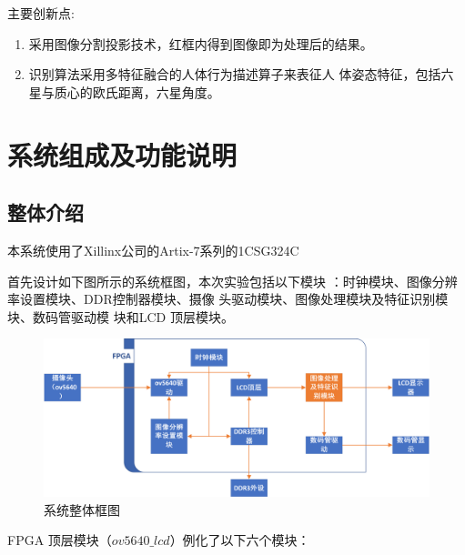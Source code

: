 \documentclass[UTF-8, a4paper, 12pt]{ctexart}
\begin{document}
主要创新点:
\begin{enumerate}
    \item 采用图像分割投影技术，红框内得到图像即为处理后的结果。
    \item 识别算法采用多特征融合的人体行为描述算子来表征人
    体姿态特征，包括六星与质心的欧氏距离，六星角度。
\end{enumerate}

\section{系统组成及功能说明}

\subsection{整体介绍}

本系统使用了Xillinx公司的Artix-7系列的1CSG324C

首先设计如下图所示的系统框图，本次实验包括以下模块
：时钟模块、图像分辨率设置模块、DDR控制器模块、摄像
头驱动模块、图像处理模块及特征识别模块、数码管驱动模
块和LCD 顶层模块。

\begin{figure}[htbp]
    \centering
    \includegraphics[width=15cm]{figs/f1.png}
    \caption{系统整体框图}
\end{figure}

FPGA 顶层模块（$ov5640\_lcd$）例化了以下六个模块：
\end{document}
